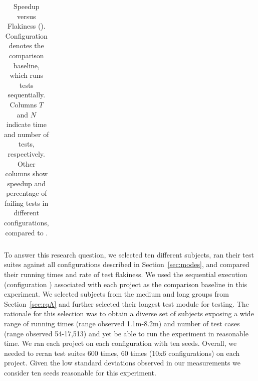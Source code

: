 \begin{table}[t]
\begin{tabular}{l|rr|rr|rr|rr|rr|rr}

\bottomrule%
\end{tabular}
\caption{Speedup versus Flakiness (\subcolB). Configuration
  \emph{\Seq{}} denotes the comparison baseline, which runs tests
  sequentially.  Columns $T$ and $N$ indicate time and number of
  tests, respectively.  Other columns show speedup and percentage of
  failing tests in different configurations, compared to
  \emph{\Seq{}}.}
\label{tab:rq6-table}
\end{table}

To answer this research question, we selected ten different subjects,
ran their test suites against all configurations described in
Section~\ref{sec:modes}, and compared their running times and rate of
test flakiness.  We used the sequential execution (configuration
\emph{\Seq{}}) associated with each project as the comparison baseline
in this experiment.  We selected subjects from the medium and long
groups from Section~\ref{sec:rqA} and further selected their longest
test module for testing.  The rationale for this selection was to
obtain a diverse set of subjects exposing a wide range of running
times (range observed 1.1m-8.2m) and number of test cases (range
observed 54-17,513) and yet be able to run the experiment in
reasonable time.  We ran each project on each configuration with ten
seeds.  Overall, we needed to reran test suites 600 times, 60 times
(10x6 configurations) on each project.  Given the low standard
deviations observed in our measurements we consider ten seeds
reasonable for this experiment.



